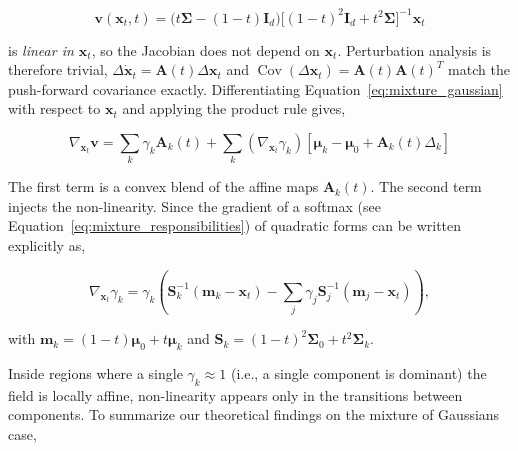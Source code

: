 \begin{equation*}
    \mathbf v(\mathbf x_t,t)=\bigl(t\boldsymbol\Sigma-(1-t)\mathbf I_d\bigr)
    \bigl[(1-t)^2\mathbf I_d+t^2\boldsymbol\Sigma\bigr]^{-1}    \mathbf x_t
\end{equation*}

is \emph{linear in $\mathbf x_t$}, so the Jacobian does not depend on $\mathbf x_t$.  Perturbation analysis is therefore trivial, $\Delta \dot{\mathbf x}_t = \mathbf A(t) \Delta \mathbf x_t$ and $\operatorname{Cov}(\Delta \mathbf x_t) = \mathbf A(t) \mathbf A(t)^{T}$ match the push-forward covariance exactly. Differentiating Equation~\eqref{eq:mixture_gaussian} with respect to $\mathbf x_t$ and applying the product rule gives,

\begin{equation}
    \nabla_{\mathbf x_t} \mathbf v = \sum_{k} \gamma_k \mathbf A_k(t) + \sum_{k}\left(\nabla_{\mathbf x_t} \gamma_k\right)
    \left[\boldsymbol \mu_k - \boldsymbol \mu_0 + \mathbf A_k(t) \Delta_k \right]
    \label{eq:jacobian-mixture}
\end{equation}

The first term is a convex blend of the affine maps $\mathbf A_k(t)$.  The second term injects the non-linearity. Since the gradient of a softmax (see Equation~\eqref{eq:mixture_responsibilities}) of quadratic forms can be written explicitly as,

\begin{equation*}
    \nabla_{\mathbf x_t} \gamma_k = \gamma_k \left(\mathbf S_k^{-1} (\mathbf m_k - \mathbf x_t) - \sum_j \gamma_j \mathbf S_j^{-1} (\mathbf m_j - \mathbf x_t)\right),
\end{equation*}

with $ \mathbf m_k = (1 -  t) \boldsymbol \mu_0 + t \boldsymbol \mu_k$ and $\mathbf S_k = (1-t)^2 \boldsymbol \Sigma_0 + t^2 \boldsymbol \Sigma_k$.  

Inside regions where a single $\gamma_k \approx1$ (i.e., a single component is dominant) the field is locally affine, non-linearity appears only in the transitions between components. To summarize our theoretical findings on the mixture of Gaussians case,


